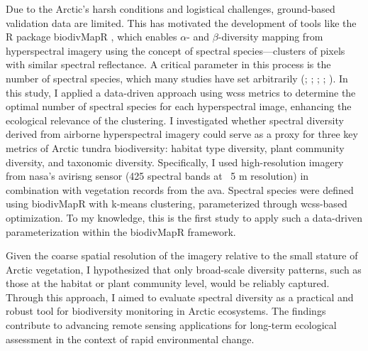 Due to the Arctic’s harsh conditions and logistical challenges, ground-based validation data are limited. This has motivated the development of tools like the R package biodivMapR \cite{feret_biodivmapr_2020}, which enables $\alpha$- and $\beta$-diversity mapping from hyperspectral imagery using the concept of spectral species—clusters of pixels with similar spectral reflectance. A critical parameter in this process is the number of spectral species, which many studies have set arbitrarily (\cite{feret_mapping_2014}; \cite{pijnenburg_mapping_2023}; \cite{zhang_assessment_2023}; \cite{robertson_effects_2023}; \cite{liccari_use_2022}). In this study, I applied a data-driven approach using \ac{wcss} metrics to determine the optimal number of spectral species for each hyperspectral image, enhancing the ecological relevance of the clustering. I investigated whether spectral diversity derived from airborne hyperspectral imagery could serve as a proxy for three key metrics of Arctic tundra biodiversity: habitat type diversity, plant community diversity, and taxonomic diversity. Specifically, I used high-resolution imagery from \ac{nasa}’s \ac{avirisng} sensor (425 spectral bands at ~5 m resolution) in combination with vegetation records from the \ac{ava}. Spectral species were defined using biodivMapR with k-means clustering, parameterized through \ac{wcss}-based optimization. To my knowledge, this is the first study to apply such a data-driven parameterization within the biodivMapR framework.

Given the coarse spatial resolution of the imagery relative to the small stature of Arctic vegetation, I hypothesized that only broad-scale diversity patterns, such as those at the habitat or plant community level, would be reliably captured. Through this approach, I aimed to evaluate spectral diversity as a practical and robust tool for biodiversity monitoring in Arctic ecosystems. The findings contribute to advancing remote sensing applications for long-term ecological assessment in the context of rapid environmental change.